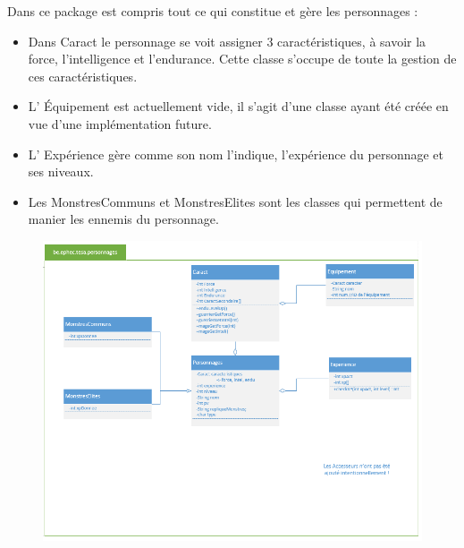 \documentclass[a4paper,titlepage]{article}
\begin{document}
	Dans ce package est compris tout ce qui constitue et gère les personnages :
	\begin{itemize}
		\item Dans \og Caract \fg{} le personnage se voit assigner 3 caractéristiques, à savoir la force, l'intelligence et l'endurance. Cette classe s'occupe de toute la gestion de ces caractéristiques.
		\item L' \og Équipement \fg{} est actuellement vide, il s'agit d'une classe ayant été créée en vue d'une implémentation future.
		\item L' \og Expérience \fg{} gère comme son nom l'indique, l'expérience du personnage et ses niveaux.
		\item Les \og MonstresCommuns \fg{} et \og MonstresElites \fg{} sont les classes qui permettent de manier les ennemis du personnage.
	\end{itemize}
	\begin{figure}[h!]
		\includegraphics[scale=0.80]{PPersonnage.png}
	\end{figure}
	
	\newpage
\end{document}
